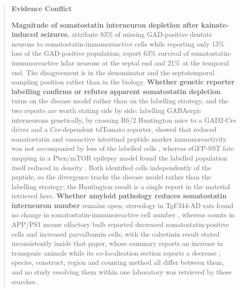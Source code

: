 \documentclass[11pt]{article}
\begin{document}
\begin{quote}
\noindent\textbf{Evidence Conflict}\par
\textbf{Magnitude of somatostatin interneuron depletion after kainate-induced seizures.} \citet{Buckmaster1999} attribute 83\% of missing GAD-positive dentate neurons to somatostatin-immunoreactive cells while reporting only 13\% loss of the GAD-positive population; \citet{Jolkkonen1997} report 63\% survival of somatostatin-immunoreactive hilar neurons at the septal end and 21\% at the temporal end. The disagreement is in the denominator and the septotemporal sampling position rather than in the biology. \textbf{Whether genetic reporter labelling confirms or refutes apparent somatostatin depletion} turns on the disease model rather than on the labelling strategy, and the two reports are worth stating side by side: labelling GABAergic interneurons genetically, by crossing R6/2 Huntington mice to a GAD2-Cre driver and a Cre-dependent tdTomato reporter, showed that reduced somatostatin and vasoactive intestinal peptide marker immunoreactivity was not accompanied by loss of the labelled cells \citep{Voelkl2022}, whereas eGFP-SST fate mapping in a Pten/mTOR epilepsy model found the labelled population itself reduced in density \citep{Drake2024}. Both identified cells independently of the peptide, so the divergence tracks the disease model rather than the labelling strategy; the Huntington result is a single report in the material retrieved here. \textbf{Whether amyloid pathology reduces somatostatin interneuron number} remains open: stereology in TgF344-AD rats found no change in somatostatin-immunoreactive cell number \citep{Futacsi2025}, whereas counts in APP/PS1 mouse olfactory bulb reported decreased somatostatin-positive cells and increased parvalbumin cells, with the calretinin result stated inconsistently inside that paper, whose summary reports an increase in transgenic animals while its co-localisation section reports a decrease \citep{DeLaRosaPrieto2016}; species, construct, region and counting method all differ between them, and no study resolving them within one laboratory was retrieved by these searches.

\end{quote}
\end{document}
